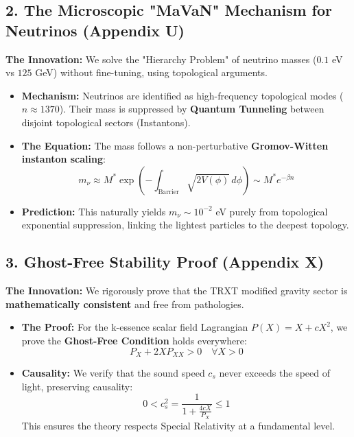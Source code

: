 \documentclass[11pt,a4paper]{article}
\begin{document}
\subsection{2. The Microscopic "MaVaN" Mechanism for Neutrinos (Appendix U)}
\textbf{The Innovation:} We solve the "Hierarchy Problem" of neutrino masses ($0.1$ eV vs $125$ GeV) without fine-tuning, using topological arguments.

\begin{itemize}
    \item \textbf{Mechanism:} Neutrinos are identified as high-frequency topological modes ($n \approx 1370$). Their mass is suppressed by \textbf{Quantum Tunneling} between disjoint topological sectors (Instantons).
    
    \item \textbf{The Equation:} The mass follows a non-perturbative \textbf{Gromov-Witten instanton scaling}:
    \begin{equation}
        m_\nu \approx M^* \exp\left( - \int_{\text{Barrier}} \sqrt{2V(\phi)} \, d\phi \right) \sim M^* e^{-\beta n}
    \end{equation}
    
    \item \textbf{Prediction:} This naturally yields $m_\nu \sim 10^{-2}$ eV purely from topological exponential suppression, linking the lightest particles to the deepest topology.
\end{itemize}

\subsection{3. Ghost-Free Stability Proof (Appendix X)}
\textbf{The Innovation:} We rigorously prove that the TRXT modified gravity sector is \textbf{mathematically consistent} and free from pathologies.

\begin{itemize}
    \item \textbf{The Proof:} For the k-essence scalar field Lagrangian $P(X) = X + cX^2$, we prove the \textbf{Ghost-Free Condition} holds everywhere:
    \begin{equation}
        \boxed{ P_X + 2X P_{XX} > 0 \quad \forall X > 0 }
    \end{equation}
    
    \item \textbf{Causality:} We verify that the sound speed $c_s$ never exceeds the speed of light, preserving causality:
    \begin{equation}
        0 < c_s^2 = \frac{1}{1 + \frac{4cX}{P_X}} \le 1
    \end{equation}
    This ensures the theory respects Special Relativity at a fundamental level.
\end{itemize}
\end{document}
